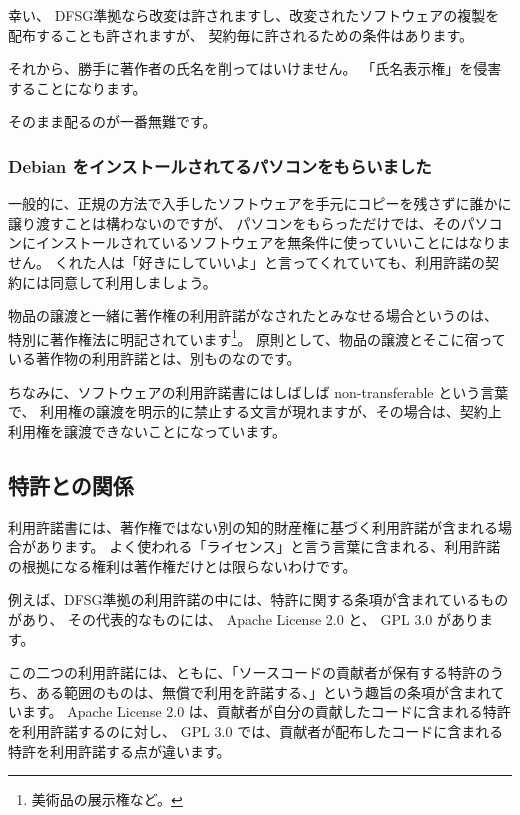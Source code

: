 \documentclass[mingoth,a4paper]{jsarticle}
\begin{document}
幸い、 DFSG準拠なら改変は許されますし、改変されたソフトウェアの複製を配布することも許されますが、
契約毎に許されるための条件はあります。

それから、勝手に著作者の氏名を削ってはいけません。
「氏名表示権」を侵害することになります。

\par\begin{center}{\Large そのまま配るのが一番無難です。}\end{center}

\subsubsection{Debian をインストールされてるパソコンをもらいました}

一般的に、正規の方法で入手したソフトウェアを手元にコピーを残さずに誰かに譲り渡すことは構わないのですが、
パソコンをもらっただけでは、そのパソコンにインストールされているソフトウェアを無条件に使っていいことにはなりません。
くれた人は「好きにしていいよ」と言ってくれていても、利用許諾の契約には同意して利用しましょう。

物品の譲渡と一緒に著作権の利用許諾がなされたとみなせる場合というのは、
特別に著作権法に明記されています\footnote{美術品の展示権など。}。
原則として、物品の譲渡とそこに宿っている著作物の利用許諾とは、別ものなのです。

ちなみに、ソフトウェアの利用許諾書にはしばしば non-transferable という言葉で、
利用権の譲渡を明示的に禁止する文言が現れますが、その場合は、契約上利用権を譲渡できないことになっています。

\subsection{特許との関係}

利用許諾書には、著作権ではない別の知的財産権に基づく利用許諾が含まれる場合があります。
よく使われる「ライセンス」と言う言葉に含まれる、利用許諾の根拠になる権利は著作権だけとは限らないわけです。

例えば、DFSG準拠の利用許諾の中には、特許に関する条項が含まれているものがあり、
その代表的なものには、 Apache License 2.0 と、 GPL 3.0 があります。

この二つの利用許諾には、ともに、「ソースコードの貢献者が保有する特許のうち、ある範囲のものは、無償で利用を許諾する、」という趣旨の条項が含まれています。
Apache License 2.0 は、貢献者が自分の貢献したコードに含まれる特許を利用許諾するのに対し、
 GPL 3.0 では、貢献者が配布したコードに含まれる特許を利用許諾する点が違います。
\end{document}
